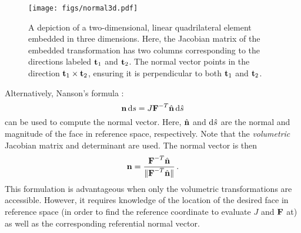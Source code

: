 \documentclass[../doc.tex]{subfiles}
\begin{document}
\begin{figure}
\centering
\texttt{[image: figs/normal3d.pdf]}
\caption{A depiction of a two-dimensional, linear quadrilateral element embedded in three dimensions. Here, the Jacobian matrix of the embedded transformation has two columns corresponding to the directions labeled $\boldsymbol{\mathrm{t}}_1$ and $\boldsymbol{\mathrm{t}}_2$. The normal vector points in the direction $\boldsymbol{\mathrm{t}}_1 \times \boldsymbol{\mathrm{t}}_2$, ensuring it is perpendicular to both $\boldsymbol{\mathrm{t}}_1$ and $\boldsymbol{\mathrm{t}}_2$. }
\label{fem:normal_diag3d}
\end{figure}

Alternatively, Nanson's formula \cite{ciarlet_elasticity,oden1971finite}: 
	\begin{equation}
		\boldsymbol{\mathrm{n}} \mathop{}\!\mathrm{d} s = J \boldsymbol{\mathrm{F}}^{-T} \hat{\boldsymbol{\mathrm{n}}} \mathop{}\!\mathrm{d} \hat{s} 
	\end{equation}
can be used to compute the normal vector. Here, $\hat{\boldsymbol{\mathrm{n}}}$ and $\mathop{}\!\mathrm{d} \hat{s}$ are the normal and magnitude of the face in reference space, respectively. Note that the \emph{volumetric} Jacobian matrix and determinant are used. The normal vector is then 
	\begin{equation}
		\boldsymbol{\mathrm{n}} = \frac{\boldsymbol{\mathrm{F}}^{-T} \hat{\boldsymbol{\mathrm{n}}}}{\| \boldsymbol{\mathrm{F}}^{-T} \hat{\boldsymbol{\mathrm{n}}}\|} \,. 
	\end{equation}
This formulation is advantageous when only the volumetric transformations are accessible. However, it requires knowledge of the location of the desired face in reference space (in order to find the reference coordinate to evaluate $J$ and $\boldsymbol{\mathrm{F}}$ at) as well as the corresponding referential normal vector. 
\end{document}
